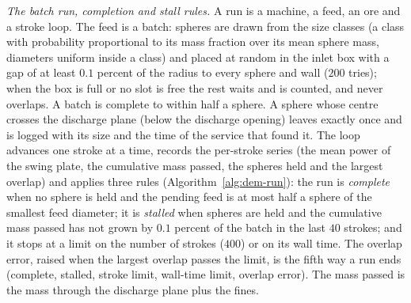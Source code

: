 \emph{The batch run, completion and stall rules.} A run is a machine, a feed, an ore and a stroke loop. The feed is a batch: spheres are drawn from the size classes (a class with probability proportional to its mass fraction over its mean sphere mass, diameters uniform inside a class) and placed
at random in the inlet box with a gap of at least $0.1$ percent of the radius to every sphere and wall ($200$ tries); when the box is full or no slot is free the rest waits and is counted, and never overlaps. A batch is complete to within half a sphere. A sphere whose centre crosses the discharge plane (below the discharge opening) leaves exactly once and is logged with its size
and the time of the service that found it. The loop advances one stroke at a time, records the per-stroke series (the mean power of the swing plate, the cumulative mass passed, the spheres held and the largest overlap) and applies three rules (Algorithm~\ref{alg:dem-run}): the run is \emph{complete} when no sphere is held and the pending feed is at most half a sphere of the smallest feed diameter; it is \emph{stalled} when
spheres are held and the cumulative mass passed has not grown by $0.1$ percent of the batch in the last $40$ strokes; and it stops at a limit on the number of strokes ($400$) or on its wall time. The overlap error, raised when the largest overlap passes the limit, is the fifth way a run ends (complete, stalled, stroke limit, wall-time limit, overlap error). The mass passed is the mass through the discharge plane plus the fines.

